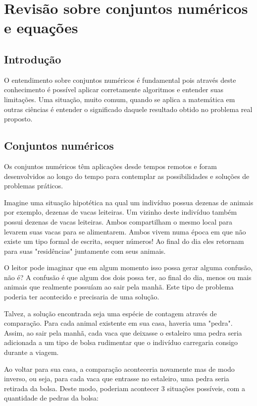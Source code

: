 
\chapter{Revisão sobre conjuntos numéricos e equações}
\section{Introdução}

O entendimento sobre conjuntos numéricos é fundamental pois através deste conhecimento é possível aplicar corretamente algoritmos e entender suas limitações. Uma situação, muito comum, quando se aplica a matemática em outras ciências é entender o significado daquele resultado obtido no problema real proposto.

\section{Conjuntos numéricos}

Os conjuntos numéricos têm aplicações desde tempos remotos e foram desenvolvidos ao longo do tempo para contemplar as possibilidades e soluções de problemas práticos.

Imagine uma situação hipotética na qual um indivíduo possua dezenas de animais por exemplo, dezenas de vacas leiteiras. Um vizinho deste indivíduo também possui dezenas de vacas leiteiras. Ambos compartilham o mesmo local para levarem suas vacas para se alimentarem. Ambos vivem numa época em que não existe um tipo formal de escrita, sequer números! Ao final do dia eles retornam para suas "residências" juntamente com seus animais.

O leitor pode imaginar que em algum momento isso possa gerar alguma confusão, não é? A confusão é que algum dos dois possa ter, ao final do dia, menos ou mais animais que realmente possuíam ao sair pela manhã. Este tipo de problema poderia ter acontecido e precisaria de uma solução.

Talvez, a solução encontrada seja uma espécie de contagem através de comparação. Para cada animal existente em sua casa, haveria uma "pedra". Assim, ao sair pela manhã, cada vaca que deixasse o estaleiro uma pedra seria adicionada a um tipo de bolsa rudimentar que o indivíduo carregaria consigo durante a viagem.

Ao voltar para sua casa, a comparação aconteceria novamente mas de modo inverso, ou seja, para cada vaca que entrasse no estaleiro, uma pedra seria retirada da bolsa. Deste modo, poderiam acontecer 3 situações possíveis, com a quantidade de pedras da bolsa:

